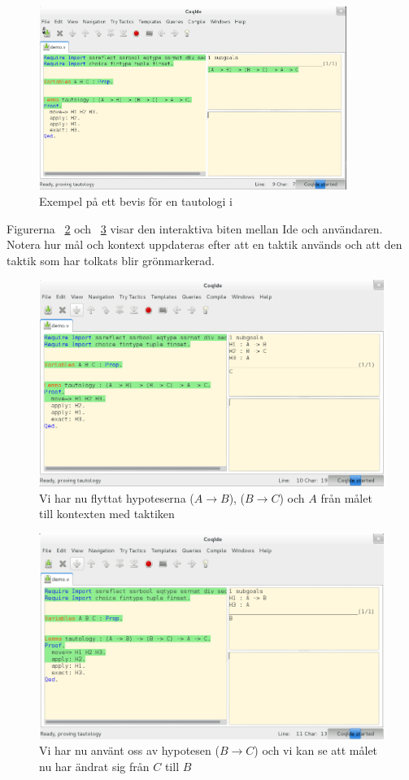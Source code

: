 \begin{figure}[H]
  \centering
  \includegraphics[width=100mm]{images/Proof_part1}
  \caption[Exempel på bevis i \coq{}]
   {Exempel på ett bevis för en tautologi i \coq{}}
  \label{fig:bevis1}
\end{figure}

Figurerna ~\ref{fig:bevis2} och ~\ref{fig:bevis3} visar den interaktiva biten
mellan \coq Ide och användaren. Notera hur mål och kontext uppdateras efter att
en taktik används och att den taktik som har tolkats blir grönmarkerad.

\begin{figure}[H]
  \centering
  \includegraphics[width=150mm]{images/Proof_part2}
  \caption[Bevis i \coq Ide]
   {Vi har nu flyttat hypoteserna ($A \rightarrow B$), ($B \rightarrow C$) och $A$
    från målet till kontexten med taktiken }
  \label{fig:bevis2}
\end{figure}

\begin{figure}[H]
  \centering
  \includegraphics[width=150mm]{images/Proof_part3}
  \caption[Bevis i \coq Ide]
   {Vi har nu använt oss av hypotesen ($B \rightarrow C$) och vi
    kan se att målet nu har ändrat sig från $C$ till $B$}
  \label{fig:bevis3}
\end{figure}
